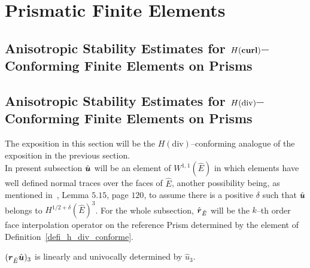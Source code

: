 \section{Prismatic Finite Elements} %
\label{sec:prismatic_finite_elements}
\subsection{An\-iso\-tropic Stability Estimates for $H(\textbf{curl})$--Conforming Finite
Elements on Prisms}
\label{stab_edge_prism}


\subsection{An\-iso\-tropic Stability Estimates for $H(\operatorname{\textrm{div}})$--Conforming Finite Elements
on Prisms} %
The exposition in this section will be the $H(\mbox{div})$--conforming analogue
of the exposition in the previous section.\\
\noindent In present subsection $\hat{\boldsymbol{u}}$ will be an element
of $W^{1,1}(\hat E)$ in which elements have well defined
normal traces over the faces of $\hat{E}$, another possibility
being, as mentioned in~\cite{monk}, Lemma $5.15$, page $120$, to assume
there is
a positive $\delta$ such that $\hat{\boldsymbol{u}}$ belongs to
$H^{1/2+\delta}(\hat{E})^3$.
For the whole subsection, $\hat{\boldsymbol{r}}_{\hat E}$ will be the $k$--th order face 
interpolation operator on the reference
Prism determined by the element of
Definition~\ref{defi_h_div_conforme}.
\label{stability_of_rt_element_in_hat_k}
\begin{lemma}\label{lemmaRT3zero}
$(\boldsymbol{r}_{\hat{E}}\hat{\boldsymbol{u}})_3$ is linearly and univocally determined by $\hat{u}_3$.
\end{lemma}
